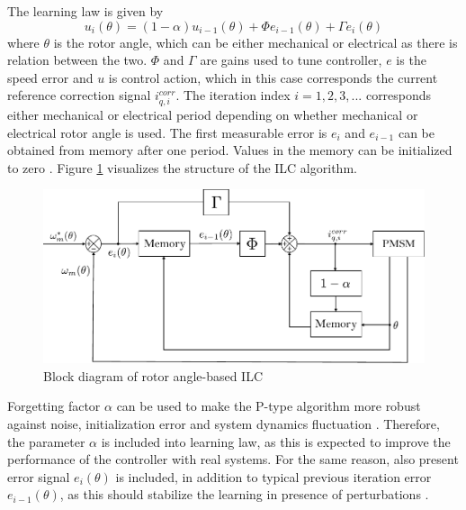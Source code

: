 The learning law is given by \cite{ILC:2005, ILC:2004}
\begin{equation}
    u_{i}(\theta) = (1 - \alpha)u_{i-1}(\theta) + \Phi e_{i-1}(\theta) + \Gamma e_{i}(\theta)
    \label{ILC_update_law2}
\end{equation}
where $\theta$ is the rotor angle, which can be either mechanical or electrical as there is relation between the two. $\Phi$ and $\Gamma$ are gains used to tune controller, $e$ is the speed error and $u$ is control action, which in this case corresponds the current reference correction signal $i^{corr}_{q,i}$. The iteration index $i = 1,2,3,...$ corresponds either mechanical or electrical period depending on whether mechanical or electrical rotor angle is used. The first measurable error is $e_i$ and $e_{i-1}$ can be obtained from memory after one period. Values in the memory can be initialized to zero \cite{ILC:2004}. Figure \ref{fig:ILC_angle_block} visualizes the structure of the ILC algorithm.
\begin{figure}[b]
    \centering
    \includegraphics[width=1.0\linewidth]{images/Angle_based_ILC.pdf} 
    \caption{Block diagram of rotor angle-based ILC}
    \label{fig:ILC_angle_block}
\end{figure}

Forgetting factor $\alpha$ can be used to make the P-type algorithm more robust against noise, initialization error and system dynamics fluctuation \cite{ILC:1990, ILC:2005}. Therefore, the parameter $\alpha$ is included into learning law, as this is expected to improve the performance of the controller with real systems. For the same reason, also present error signal $e_{i}(\theta)$ is included, in addition to typical previous iteration error $e_{i-1}(\theta)$, as this should stabilize the learning in presence of perturbations \cite{ILC:2004}.


